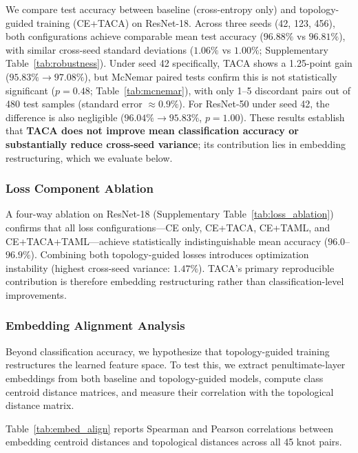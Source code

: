 \documentclass[preprint,review,12pt]{elsarticle}
\begin{document}
We compare test accuracy between baseline (cross-entropy only) and topology-guided training (CE+TACA) on ResNet-18. Across three seeds (42, 123, 456), both configurations achieve comparable mean test accuracy ($96.88\%$ vs $96.81\%$), with similar cross-seed standard deviations ($1.06\%$ vs $1.00\%$; Supplementary Table~\ref{tab:robustness}). Under seed 42 specifically, TACA shows a 1.25-point gain ($95.83\% \to 97.08\%$), but McNemar paired tests confirm this is not statistically significant ($p = 0.48$; Table~\ref{tab:mcnemar}), with only 1--5 discordant pairs out of 480 test samples (standard error $\approx 0.9\%$). For ResNet-50 under seed 42, the difference is also negligible ($96.04\% \to 95.83\%$, $p = 1.00$). These results establish that \textbf{TACA does not improve mean classification accuracy or substantially reduce cross-seed variance}; its contribution lies in embedding restructuring, which we evaluate below.


\subsubsection{Loss Component Ablation}

A four-way ablation on ResNet-18 (Supplementary Table~\ref{tab:loss_ablation}) confirms that all loss configurations---CE only, CE+TACA, CE+TAML, and CE+TACA+TAML---achieve statistically indistinguishable mean accuracy ($96.0$--$96.9\%$). Combining both topology-guided losses introduces optimization instability (highest cross-seed variance: $1.47\%$). TACA's primary reproducible contribution is therefore embedding restructuring rather than classification-level improvements.

\subsubsection{Embedding Alignment Analysis}\label{sec:embedding_analysis}

Beyond classification accuracy, we hypothesize that topology-guided training restructures the learned feature space. To test this, we extract penultimate-layer embeddings from both baseline and topology-guided models, compute class centroid distance matrices, and measure their correlation with the topological distance matrix.

Table~\ref{tab:embed_align} reports Spearman and Pearson correlations between embedding centroid distances and topological distances across all 45 knot pairs.
\end{document}
